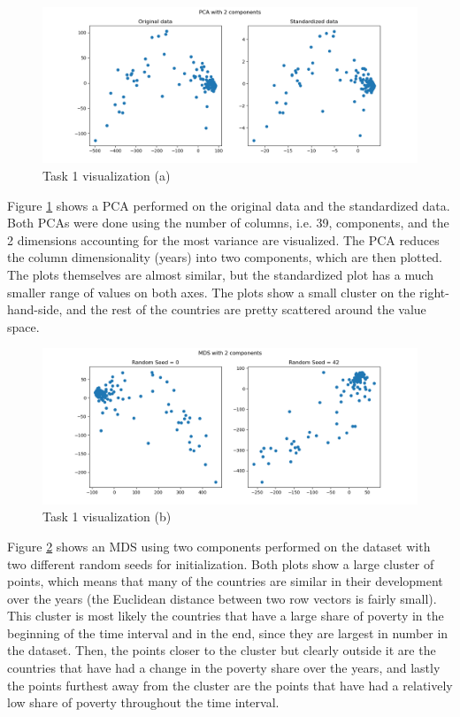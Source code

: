 \documentclass[11pt,a4paper,titlepage]{article}
\begin{document}
\begin{figure}[h!]
    \centering
    \includegraphics[width=1.0\linewidth]{reports/assignment-4/imgs/pca.png}
    \caption{Task 1 visualization (a)}
    \label{fig:pca}
\end{figure}

Figure \ref{fig:pca} shows a PCA performed on the original data and the standardized data. Both PCAs were done using the number of columns, i.e. 39, components, and the 2 dimensions accounting for the most variance are visualized. The PCA reduces the column dimensionality (years) into two components, which are then plotted. The plots themselves are almost similar, but the standardized plot has a much smaller range of values on both axes. The plots show a small cluster on the right-hand-side, and the rest of the countries are pretty scattered around the value space.

\begin{figure}[h!]
    \centering
    \includegraphics[width=1.0\linewidth]{reports/assignment-4/imgs/mds.png}
    \caption{Task 1 visualization (b)}
    \label{fig:mds}
\end{figure}

\newpage

Figure \ref{fig:mds} shows an MDS using two components performed on the dataset with two different random seeds for initialization. Both plots show a large cluster of points, which means that many of the countries are similar in their development over the years (the Euclidean distance between two row vectors is fairly small). This cluster is most likely the countries that have a large share of poverty in the beginning of the time interval and in the end, since they are largest in number in the dataset. Then, the points closer to the cluster but clearly outside it are the countries that have had a change in the poverty share over the years, and lastly the points furthest away from the cluster are the points that have had a relatively low share of poverty throughout the time interval.
\end{document}
